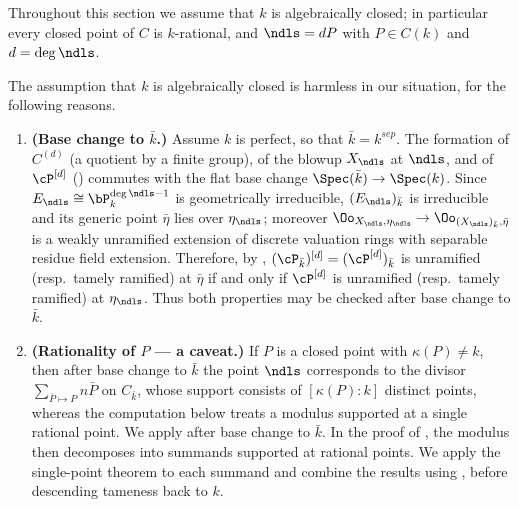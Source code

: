 Throughout this section we assume that $k$ is algebraically closed; in particular every closed point of $C$ is $k$-rational, and $\ndls = dP$ with $P \in C(k)$ and $d = \deg \ndls$.

\begin{rem*}
    The assumption that $k$ is algebraically closed is harmless in our situation, for the following reasons.
    \begin{enumerate}
        \item \textbf{(Base change to $\bar{k}$.)} Assume $k$ is perfect, so that $\bar{k}=k^{sep}$.
        The formation of $C^{(d)}$ (a quotient by a finite group), of the blowup $X_\ndls$ at $\ndls$, and of
        $\cP^{[d]}$ () commutes with the flat base change $\Spec(\bar{k}) \to \Spec(k)$.
        Since $E_\ndls \cong \bP^{\deg \ndls - 1}_k$ is geometrically irreducible, $(E_\ndls)_{\bar{k}}$ is irreducible
        and its generic point $\bar{\eta}$ lies over $\eta_\ndls$; moreover
        $\Oo_{X_\ndls, \eta_\ndls} \to \Oo_{(X_\ndls)_{\bar{k}}, \bar{\eta}}$ is a weakly unramified extension of discrete
        valuation rings with separable residue field extension. Therefore, by
        ,
        $(\cP_{\bar{k}})^{[d]}=(\cP^{[d]})_{\bar{k}}$ is unramified
        (resp.\ tamely ramified) at $\bar{\eta}$ if and only if
        $\cP^{[d]}$ is unramified (resp.\ tamely ramified) at $\eta_\ndls$.
        Thus both properties may be checked after base change to $\bar{k}$.
        \item \textbf{(Rationality of $P$ --- a caveat.)} If $P$ is a closed point with $\kappa(P) \neq k$, then after base
        change to $\bar{k}$ the point $\ndls$ corresponds to the divisor $\sum_{\bar{P} \mapsto P} n \bar{P}$ on
        $C_{\bar{k}}$, whose support consists of $[\kappa(P):k]$ distinct points, whereas the computation below treats a
        modulus supported at a single rational point.
        We apply  after base
        change to $\bar{k}$. In the proof of
        , the modulus
        then decomposes into summands supported at rational points. We apply
        the single-point theorem to each summand and combine the results
        using , before descending tameness back
        to $k$.
    \end{enumerate}
\end{rem*}


